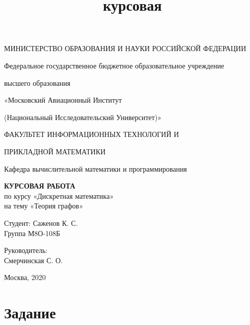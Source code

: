 \documentclass[a4paper, 12pt]{article}
\title{курсовая}
\begin{document}
\begin{titlepage}
    \begin{center}
    МИНИСТЕРСТВО ОБРАЗОВАНИЯ И НАУКИ РОССИЙСКОЙ ФЕДЕРАЦИИ
    
    Федеральное государственное бюджетное образовательное учреждение
    
    высшего образования
    
    
    «Московский Авиационный Институт
    
    (Национальный Исследовательский Университет)»
    
    ФАКУЛЬТЕТ ИНФОРМАЦИОННЫХ ТЕХНОЛОГИЙ И
    
    ПРИКЛАДНОЙ МАТЕМАТИКИ
    
    Кафедра вычислительной математики и программирования
    \vfill
    
    \textbf{КУРСОВАЯ РАБОТА}\\[5mm]
    по курсу «Дискретная математика»\\
    на тему «Теория графов»
    
    \end{center}
    \vfill
    
    \newlength{\ML}
    \hfill\begin{minipage}{0.4\textwidth}
    Студент: Саженов К. С.\\
    Группа М8О-108Б
    \end{minipage}%
    \bigskip
    
    \hfill\begin{minipage}{0.4\textwidth}
    Руководитель:\\
    Смерчинская С. О.
    \end{minipage}%
    \vfill
    
    \begin{center}
    Москва, 2020
    \end{center}
    \end{titlepage}
\section{Задание}
\end{document}
